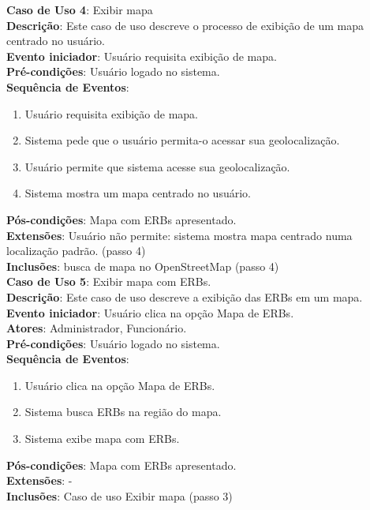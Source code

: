 \documentclass[]{politex}
\begin{document}
\noindent \textbf{Caso de Uso 4}: Exibir mapa \\
\textbf{Descrição}: Este caso de uso descreve o processo de exibição de um mapa centrado no usuário. \\
\textbf{Evento iniciador}: Usuário requisita exibição de mapa. \\
\textbf{Pré-condições}: Usuário logado no sistema. \\
\textbf{Sequência de Eventos}:
\begin{enumerate}
\item Usuário requisita exibição de mapa.
\item Sistema pede que o usuário permita-o acessar sua geolocalização.
\item Usuário permite que sistema acesse sua geolocalização.
\item Sistema mostra um mapa centrado no usuário.
\end{enumerate}
\textbf{Pós-condições}: Mapa com ERBs apresentado. \\
\textbf{Extensões}: Usuário não permite: sistema mostra mapa centrado numa localização padrão. (passo 4) \\
\textbf{Inclusões}: busca de mapa no OpenStreetMap (passo 4) \\

\noindent \textbf{Caso de Uso 5}: Exibir mapa com ERBs. \\
\textbf{Descrição}: Este caso de uso descreve a exibição das ERBs em um mapa. \\
\textbf{Evento iniciador}: Usuário clica na opção Mapa de ERBs. \\
\textbf{Atores}: Administrador, Funcionário. \\
\textbf{Pré-condições}: Usuário logado no sistema. \\
\textbf{Sequência de Eventos}:
\begin{enumerate}
\item Usuário clica na opção Mapa de ERBs.
\item Sistema busca ERBs na região do mapa.
\item Sistema exibe mapa com ERBs.
\end{enumerate}
\textbf{Pós-condições}: Mapa com ERBs apresentado. \\
\textbf{Extensões}: - \\
\textbf{Inclusões}: Caso de uso Exibir mapa (passo 3) \\
\end{document}

